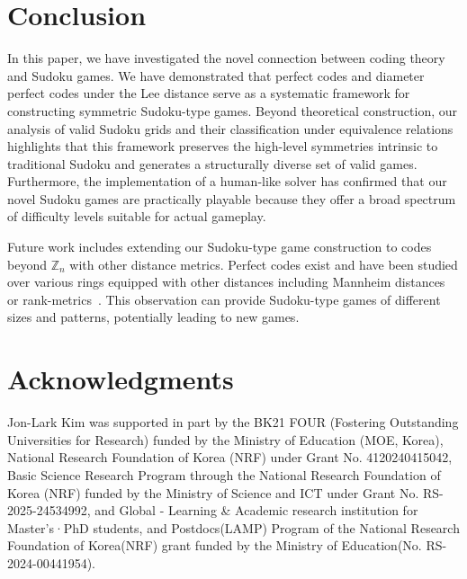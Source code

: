 \documentclass{article}
\theoremstyle{definition}
\begin{document}
\section{Conclusion}
In this paper, we have investigated the novel connection between coding theory and Sudoku games. We have demonstrated that perfect codes and diameter perfect codes under the Lee distance serve as a systematic framework for constructing symmetric Sudoku-type games. Beyond theoretical construction, our analysis of valid Sudoku grids and their classification under equivalence relations highlights that this framework preserves the high-level symmetries intrinsic to traditional Sudoku and generates a structurally diverse set of valid games. Furthermore, the implementation of a human-like solver has confirmed that our novel Sudoku games are practically playable because they offer a broad spectrum of difficulty levels suitable for actual gameplay.

Future work includes extending our Sudoku-type game construction to codes beyond $\mathbb{Z}_n$ with other distance metrics. Perfect codes exist and have been studied over various rings equipped with other distances including Mannheim distances~\cite{GH14} or rank-metrics~\cite{MZ25}. This observation can provide Sudoku-type games of different sizes and patterns, potentially leading to new games.

\section*{Acknowledgments}
Jon-Lark Kim was supported in part by the BK21 FOUR (Fostering Outstanding Universities for Research) funded by the Ministry of Education (MOE, Korea), National Research Foundation of Korea (NRF) under Grant No. 4120240415042, Basic Science Research Program through the National Research Foundation of Korea (NRF) funded by the Ministry of Science and ICT under Grant No. RS-2025-24534992, and Global - Learning \& Academic research institution for Master’s·PhD students, and Postdocs(LAMP) Program of the National Research Foundation of Korea(NRF) grant funded by the Ministry of Education(No. RS-2024-00441954).
\end{document}

